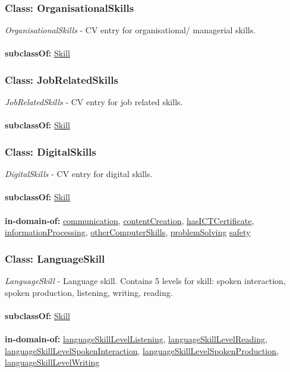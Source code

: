 \documentclass[a4paper,12pt]{article}
\numberwithin{equation}{section}
\begin{document}
\subsubsection{Class: OrganisationalSkills}\hypertarget{OrganisationalSkills}{}
\textit{OrganisationalSkills} - CV entry for organisational/ managerial skills.
\\\\
\textbf{subclassOf:} \hyperlink{Skill}{Skill}

\subsubsection{Class: JobRelatedSkills}\hypertarget{JobRelatedSkills}{}
\textit{JobRelatedSkills} - CV entry for job related skills.
\\\\
\textbf{subclassOf:} \hyperlink{Skill}{Skill}

\subsubsection{Class: DigitalSkills}\hypertarget{DigitalSkills}{}
\textit{DigitalSkills} - CV entry for digital skills.
\\\\
\textbf{subclassOf:} \hyperlink{Skill}{Skill}
\\\\
\textbf{in-domain-of:} \hyperlink{communication}{communication}, \hyperlink{contentCreation}{contentCreation}, \hyperlink{hasICTCertificate}{hasICTCertificate},  \hyperlink{informationProcessing}{informationProcessing}, \hyperlink{otherComputerSkills}{otherComputerSkills}, \hyperlink{problemSolving}{problemSolving} \hyperlink{safety}{safety}

\subsubsection{Class: LanguageSkill}\hypertarget{LanguageSkill}{}
\textit{LanguageSkill} - Language skill. Contains 5 levels for skill: spoken interaction, spoken production, listening, writing, reading.
\\\\
\textbf{subclassOf:} \hyperlink{Skill}{Skill}
\\\\
\textbf{in-domain-of:} \hyperlink{languageSkillLevelListening}{languageSkillLevelListening}, \hyperlink{languageSkillLevelReading}{languageSkillLevelReading}, \hyperlink{languageSkillLevelSpokenInteraction}{languageSkillLevelSpokenInteraction}, \hyperlink{languageSkillLevelSpokenProduction}{languageSkillLevelSpokenProduction}, \hyperlink{languageSkillLevelWriting}{languageSkillLevelWriting}
\end{document}
